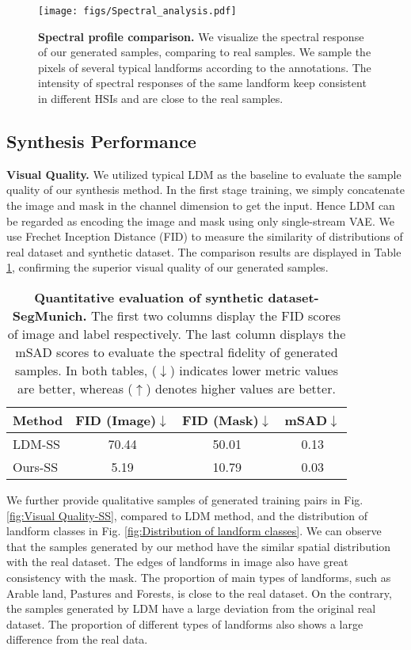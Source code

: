 \begin{figure*}[t]
    \centering
    \texttt{[image: figs/Spectral\_analysis.pdf]}
    \vspace{-10mm}
    \caption{\textbf{Spectral profile comparison.} We visualize the spectral response of our generated samples, comparing to real samples. We sample the pixels of several typical landforms according to the annotations. The intensity of spectral responses of the same landform keep consistent in different HSIs and are close to the real samples.}
    \label{fig:Spectral analysis}
\end{figure*}

\subsection{Synthesis Performance}
\noindent
\textbf{Visual Quality.} We utilized typical LDM \cite{ldm} as the baseline to evaluate the sample quality of our synthesis method. In the first stage training, we simply concatenate the image and mask in the channel dimension to get the input. Hence LDM can be regarded as encoding the image and mask using only single-stream VAE. We use Frechet Inception Distance (FID) \cite{fid} to measure the similarity of distributions of real dataset and synthetic dataset. The comparison results are displayed in Table \ref{tab:visual quality-ss}, confirming the superior visual quality of our generated samples.

\begin{table}[t]
  \centering
    \begin{tabular}{lccc}
    \toprule
    Method & FID (Image)$\downarrow$ & FID (Mask)$\downarrow$ & mSAD$\downarrow$ \\
    \midrule
    LDM-SS & 70.44 & 50.01 & 0.13\\
    Ours-SS & 5.19 & 10.79 & 0.03\\
    \bottomrule
  \end{tabular}
  \caption{\textbf{Quantitative evaluation of synthetic dataset-SegMunich.} The first two columns display the FID scores of image and label respectively. The last column displays the mSAD scores to evaluate the spectral fidelity of generated samples. In both tables, ($\downarrow$) indicates lower metric values are better, whereas ($\uparrow$) denotes higher values are better.}
  \label{tab:visual quality-ss}
\end{table}

We further provide qualitative samples of generated training pairs in Fig. \ref{fig:Visual Quality-SS}, compared to LDM method, and the distribution of landform classes in Fig. \ref{fig:Distribution of landform classes}. We can observe that the samples generated by our method have the similar spatial distribution with the real dataset. The edges of landforms in image also have great consistency with the mask. The proportion of main types of landforms, such as Arable land, Pastures and Forests, is close to the real dataset. On the contrary, the samples generated by LDM have a large deviation from the original real dataset. The proportion of different types of landforms also shows a large difference from the real data.

